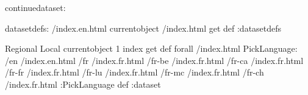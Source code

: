 \begin{ingrid}
continuedataset:

datasetdefs:
/index.en.html currentobject /index.html get def
:datasetdefs

{ Regional Local } { currentobject 1 index get def } forall
/index.html {
PickLanguage:
/en /index.en.html
/fr /index.fr.html
/fr-be /index.fr.html
/fr-ca /index.fr.html
/fr-fr /index.fr.html
/fr-lu /index.fr.html
/fr-mc /index.fr.html
/fr-ch /index.fr.html
:PickLanguage
} def
:dataset
\end{ingrid}
